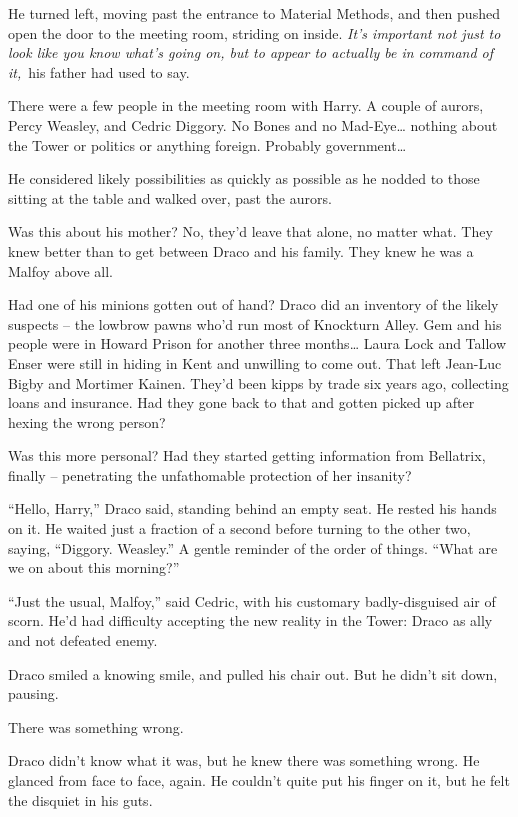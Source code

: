He turned left, moving past the entrance to Material Methods, and then
pushed open the door to the meeting room, striding on inside. \emph{It's
important not just to look like you know what's going on, but to appear
to actually be in command of it,}~his father had used to say.

There were a few people in the meeting room with Harry. A couple of
aurors, Percy Weasley, and Cedric Diggory. No Bones and no
Mad-Eye\ldots{} nothing about the Tower or politics or anything foreign.
Probably government\ldots{}

He considered likely possibilities as quickly as possible as he nodded
to those sitting at the table and walked over, past the aurors.

Was this about his mother? No, they'd leave that alone, no matter what.
They knew better than to get between Draco and his family. They knew he
was a Malfoy above all.

Had one of his minions gotten out of hand? Draco did an inventory of the
likely suspects -- the lowbrow pawns who'd run most of Knockturn Alley.
Gem and his people were in Howard Prison for another three
months\ldots{} Laura Lock and Tallow Enser were still in hiding in Kent
and unwilling to come out. That left Jean-Luc Bigby and Mortimer Kainen.
They'd been kipps by trade six years ago, collecting loans and
insurance. Had they gone back to that and gotten picked up after hexing
the wrong person?

Was this more personal? Had they started getting information from
Bellatrix, finally -- penetrating the unfathomable protection of her
insanity?

``Hello, Harry,'' Draco said, standing behind an empty seat. He rested
his hands on it. He waited just a fraction of a second before turning to
the other two, saying, ``Diggory. Weasley.'' A gentle reminder of the
order of things. ``What are we on about this morning?''

``Just the usual, Malfoy,'' said Cedric, with his customary
badly-disguised air of scorn. He'd had difficulty accepting the new
reality in the Tower: Draco as ally and not defeated enemy.

Draco smiled a knowing smile, and pulled his chair out. But he didn't
sit down, pausing.

There was something wrong.

Draco didn't know what it was, but he knew there was something wrong. He
glanced from face to face, again. He couldn't quite put his finger on
it, but he felt the disquiet in his guts.

